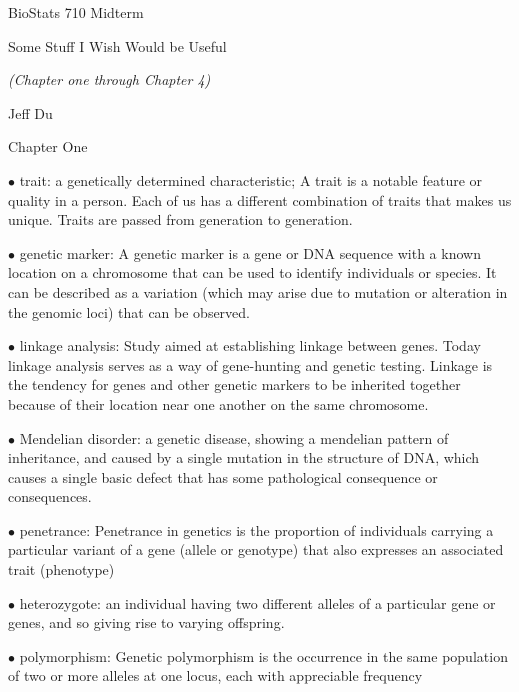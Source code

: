 \documentclass{article}
\begin{document}
\centerline{\sc \large BioStats 710 Midterm}
\vspace{1pc}
\centerline{\sc Some Stuff I Wish Would be Useful}
\vspace{1pc}

\centerline{\it (Chapter one through Chapter 4)}

\vspace{1pc}
\centerline{\sc    Jeff Du}
\vspace{2pc}


\centerline{\sc Chapter One}
\vspace{0.2in}

$\bullet$ trait: 
a genetically determined characteristic; A trait is a notable feature or quality in a person. Each of us has a different combination of traits that makes us unique. 
Traits are passed from generation to generation.\vspace{0.1in}

$\bullet$ genetic marker: 
A genetic marker is a gene or DNA sequence with a known location on a chromosome that can be used to identify individuals or species. It can be described as a variation (which may arise due to mutation or alteration in the genomic loci) that can be observed. \vspace{0.1in}


$\bullet$ linkage analysis: 
Study aimed at establishing linkage between genes. Today linkage analysis serves as a way of gene-hunting and genetic testing. Linkage is the tendency for genes and other genetic markers to be inherited together because of their location near one another on the same chromosome.

\vspace{0.1in}
$\bullet$ Mendelian disorder: 
a genetic disease, showing a mendelian pattern of inheritance, and caused by a single mutation in the structure of DNA, which causes a single basic defect that has some pathological consequence or consequences.

\vspace{0.1in}
$\bullet$ penetrance: 
Penetrance in genetics is the proportion of individuals carrying a particular variant of a gene (allele or genotype) that also expresses an associated trait (phenotype)

\vspace{0.1in}
$\bullet$ heterozygote: 
an individual having two different alleles of a particular gene or genes, and so giving rise to varying offspring.

\vspace{0.1in}
$\bullet$ polymorphism: 
Genetic polymorphism is the occurrence in the same population of two or more alleles at one locus, each with appreciable frequency
\end{document}
